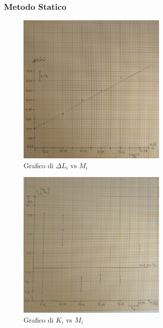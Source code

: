 \documentclass[a4paper]{article}
\begin{document}
{\subsubsection{Metodo Statico}
\begin{figure}[!ht]
    \centering
    \includegraphics[width=0.65\textwidth, trim={0 0 0 20cm}, clip = true]{fotomolla/Molla 1/m1statico_lm.jpg}
    \caption{Grafico di $\Delta L_i$ vs $M_i$}
\end{figure}

\begin{figure}[!ht]
    \centering
    \includegraphics[width=0.65\textwidth]{fotomolla/Molla 1/m1statico_km.jpg}
    \caption{Grafico di $K_i$ vs $M_i$}
\end{figure}

}
\end{document}
